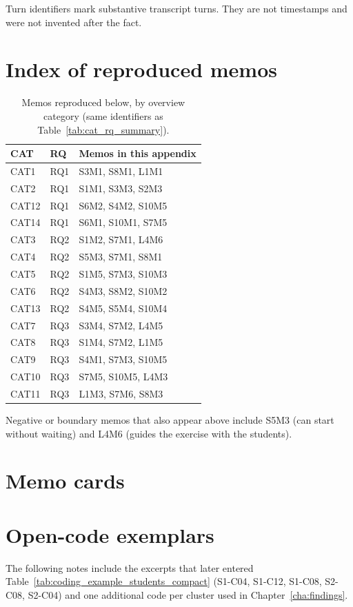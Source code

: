 Turn identifiers mark substantive transcript turns. They are not timestamps and were not invented after the fact.

\section{Index of reproduced memos}
\label{app:audit_index}

\begin{table}[htbp]
\centering
\footnotesize
\setlength{\tabcolsep}{3pt}
\caption{Memos reproduced below, by overview category (same identifiers as Table~\ref{tab:cat_rq_summary}).}
\label{tab:audit_memo_index}
\begin{tabularx}{\textwidth}{l l >{\raggedright\arraybackslash}X}
\toprule
\textbf{CAT} & \textbf{RQ} & \textbf{Memos in this appendix} \\
\midrule
CAT1 & RQ1 & S3M1, S8M1, L1M1 \\
CAT2 & RQ1 & S1M1, S3M3, S2M3 \\
CAT12 & RQ1 & S6M2, S4M2, S10M5 \\
CAT14 & RQ1 & S6M1, S10M1, S7M5 \\
CAT3 & RQ2 & S1M2, S7M1, L4M6 \\
CAT4 & RQ2 & S5M3, S7M1, S8M1 \\
CAT5 & RQ2 & S1M5, S7M3, S10M3 \\
CAT6 & RQ2 & S4M3, S8M2, S10M2 \\
CAT13 & RQ2 & S4M5, S5M4, S10M4 \\
CAT7 & RQ3 & S3M4, S7M2, L4M5 \\
CAT8 & RQ3 & S1M4, S7M2, L1M5 \\
CAT9 & RQ3 & S4M1, S7M3, S10M5 \\
CAT10 & RQ3 & S7M5, S10M5, L4M3 \\
CAT11 & RQ3 & L1M3, S7M6, S8M3 \\
\bottomrule
\end{tabularx}
\end{table}

Negative or boundary memos that also appear above include S5M3 (can start without waiting) and L4M6 (guides the exercise with the students).

\section{Memo cards}
\label{app:audit_memos}



\section{Open-code exemplars}
\label{app:audit_codes}

The following notes include the excerpts that later entered Table~\ref{tab:coding_example_students_compact} (S1-C04, S1-C12, S1-C08, S2-C08, S2-C04) and one additional code per cluster used in Chapter~\ref{cha:findings}.

